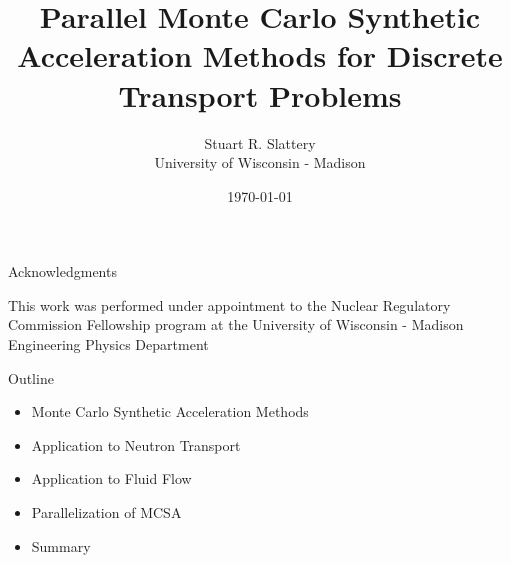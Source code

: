 \documentclass{beamer}
\author{Stuart R. Slattery\\ University of Wisconsin - Madison}
\date{\today}
\title{Parallel Monte Carlo Synthetic Acceleration Methods for
  Discrete Transport Problems}
\begin{document}
\maketitle

\begin{frame}{Acknowledgments}

  This work was performed under appointment to the Nuclear Regulatory
  Commission Fellowship program at the University of Wisconsin - Madison
  Engineering Physics Department

\end{frame}

\begin{frame}{Outline}

  \begin{itemize}
  \item Monte Carlo Synthetic Acceleration Methods
    \bigskip
  \item Application to Neutron Transport
    \bigskip
  \item Application to Fluid Flow
    \bigskip
  \item Parallelization of MCSA
    \bigskip
  \item Summary
  \end{itemize}

\end{frame}
\end{document}
